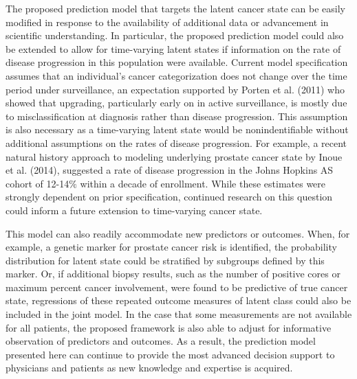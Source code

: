 \documentclass[12pt, letterpaper]{article}
\begin{document}
The proposed prediction model that targets the latent cancer state can be easily modified in response to the availability of additional data or advancement in scientific understanding. In particular, the proposed prediction model could also be extended to allow for time-varying latent states if information on the rate of disease progression in this population were available. Current model specification assumes that  an individual's cancer categorization does not change over the time period under surveillance, an expectation supported by Porten et al. (2011)\nocite{Porten2011} who showed that upgrading, particularly early on in active surveillance, is mostly due to misclassification at diagnosis rather than disease progression. This assumption is also necessary as a time-varying latent state would be nonindentifiable without additional assumptions on the rates of disease progression. For example, a recent natural history approach to modeling underlying prostate cancer state by Inoue et al. (2014)\nocite{Inoue2014}, suggested a rate of disease progression in the Johns Hopkins AS cohort of 12-14$\%$ within a decade of enrollment. While these estimates were strongly dependent on prior specification, continued research on this question could inform a future extension to time-varying cancer state.




This model can also readily accommodate new predictors or outcomes. When, for example, a genetic marker for prostate cancer risk is identified, the probability distribution for latent state could be stratified by subgroups defined by this marker. Or, if additional biopsy results, such as the number of positive cores or maximum percent cancer involvement, were found to be predictive of true cancer state, regressions of these repeated outcome measures of latent class could also be included in the joint model. In the case that some measurements are not available for all patients, the proposed framework is also able to adjust for informative observation of predictors and outcomes. As a result, the prediction model presented here can continue to provide the most advanced decision support to physicians and patients as new knowledge and expertise is acquired.







\end{document}

